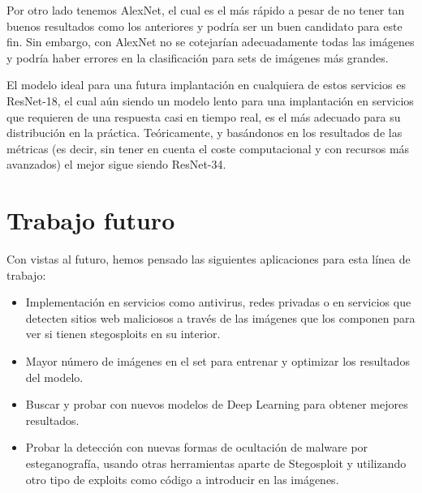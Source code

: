 Por otro lado tenemos AlexNet, el cual es el más rápido a pesar de no tener tan buenos resultados como los anteriores y podría ser un buen candidato para este fin. Sin embargo, con AlexNet no se cotejarían adecuadamente todas las imágenes y podría haber errores en la clasificación para sets de imágenes más grandes.

El modelo ideal para una futura implantación en cualquiera de estos servicios es ResNet-18, el cual aún siendo un modelo lento para una implantación en servicios que requieren de una respuesta casi en tiempo real, es el más adecuado para su distribución en la práctica. Teóricamente, y basándonos en los resultados de las métricas (es decir, sin tener en cuenta el coste computacional y con recursos más avanzados) el mejor sigue siendo ResNet-34.

\section{Trabajo futuro}

Con vistas al futuro, hemos pensado las siguientes aplicaciones para esta línea de trabajo:

\begin{itemize}
\item Implementación en servicios como antivirus, redes privadas o en servicios que detecten sitios web maliciosos a través de las imágenes que los componen para ver si tienen stegosploits en su interior.
\item Mayor número de imágenes en el set para entrenar y optimizar los resultados del modelo.
\item Buscar y probar con nuevos modelos de Deep Learning para obtener mejores resultados.
\item Probar la detección con nuevas formas de ocultación de malware por esteganografía, usando otras herramientas aparte de Stegosploit y utilizando otro tipo de exploits como código a introducir en las imágenes.
\end{itemize}

